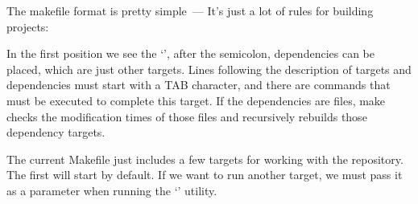 The makefile format is pretty simple~--- It's just a lot of rules
for building projects:
In the first position we see the `', after the semicolon,
dependencies can be placed, which are just other targets. Lines following
the description of targets and dependencies must start with a TAB character,
and there are commands that must be executed to complete this target.
If the dependencies are files, make checks the modification times of
those files and recursively rebuilds those dependency targets.

The current Makefile just includes a few targets for working with
the  repository. The first will start by default. If we want to run
another target, we must pass it as a parameter when running
the `' utility.
